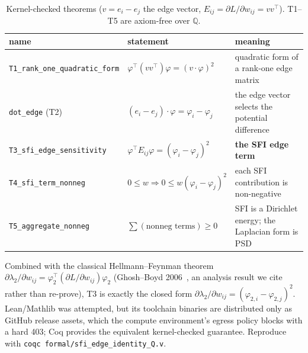 \documentclass[11pt]{article}
\theoremstyle{definition}
\newcommand{\lam}{\lambda}
\newcommand{\phii}{\varphi}
\newcommand{\code}[1]{\texttt{#1}}
\begin{document}
\begin{table}[H]
\centering
\caption{Kernel-checked theorems ($v=e_i-e_j$ the edge vector, $E_{ij}=\partial
L/\partial w_{ij}=vv^{\!\top}$). T1--T5 are axiom-free over $\mathbb{Q}$.}
\label{tab:coq}
\small
\begin{tabularx}{\linewidth}{@{}l l X@{}}
\toprule
name & statement & meaning \\
\midrule
\code{T1\_rank\_one\_quadratic\_form} & $\phii^{\!\top}(vv^{\!\top})\phii=(v\cdot\phii)^2$ & quadratic form of a rank-one edge matrix \\
\code{dot\_edge} (T2) & $(e_i-e_j)\cdot\phii=\phii_i-\phii_j$ & the edge vector selects the potential difference \\
\code{T3\_sfi\_edge\_sensitivity} & $\phii^{\!\top}E_{ij}\phii=(\phii_i-\phii_j)^2$ & \textbf{the SFI edge term} \\
\code{T4\_sfi\_term\_nonneg} & $0\leq w\Rightarrow 0\leq w(\phii_i-\phii_j)^2$ & each SFI contribution is non-negative \\
\code{T5\_aggregate\_nonneg} & $\sum(\text{nonneg terms})\geq0$ & SFI is a Dirichlet energy; the Laplacian form is PSD \\
\bottomrule
\end{tabularx}
\end{table}

Combined with the classical Hellmann--Feynman theorem
$\partial\lam_2/\partial w_{ij}=\phii_2^{\!\top}(\partial L/\partial w_{ij})\phii_2$
(Ghosh--Boyd 2006~\cite{ghosh2006}, an analysis result we cite rather than
re-prove), T3 is exactly the closed form $\partial\lam_2/\partial
w_{ij}=(\phii_{2,i}-\phii_{2,j})^2$.
Lean/Mathlib was attempted, but its toolchain binaries are distributed only as
GitHub release assets, which the compute environment's egress policy blocks with
a hard 403; Coq provides the equivalent kernel-checked guarantee. Reproduce
with \code{coqc formal/sfi\_edge\_identity\_Q.v}.
\end{document}
